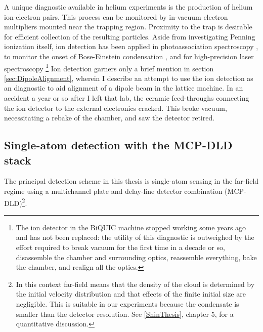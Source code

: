 	A unique diagnostic available in helium experiments is the production of helium ion-electron pairs.
	This process can be monitored by in-vacuum electron multipliers mounted near the trapping region.
	Proximity to the trap is desirable for efficient collection of the resulting particles.
	Aside from investigating Penning ionization itself, ion detection has been applied in photoassociation spectroscopy \cite{Herschbach00,Koelemeij04}, to monitor the onset of Bose-Einstein condensation \cite{Tychkov06}, and for high-precision laser spectroscopy \cite{Rengelink18}
	\footnote{The ion detector in the BiQUIC machine stopped working some years ago and has not been replaced: the utility of this diagnostic is outweighed by the effort required to break vacuum for the first time in a decade or so, disassemble the chamber and surrounding optics, reassemble everything, bake the chamber, and realign all the optics.}
	Ion detection garners only a brief mention in section \ref{sec:DipoleAlignment}, wherein I describe an attempt to use the ion detection as an diagnostic to aid alignment of a dipole beam in the lattice machine.
	In an accident a year or so after I left that lab, the ceramic feed-throughs connecting the ion detector to the external electronics cracked.
	This broke vacuum, necessitating a rebake of the chamber, and saw the detector retired.
	


\subsection*{Single-atom detection with the MCP-DLD stack}
	\label{sec:DLD}
	The principal detection scheme in this thesis is single-atom sensing in the far-field regime using a multichannel plate and delay-line detector combination (MCP-DLD)\footnote{In this context far-field means that the density of the cloud is determined by the initial velocity distribution and that effects of the finite initial size are negligible. This is suitable in our experiments because the condensate is smaller than the detector resolution. See \ref{ShinThesis}, chapter 5, for a quantitative discussion.}.
	

